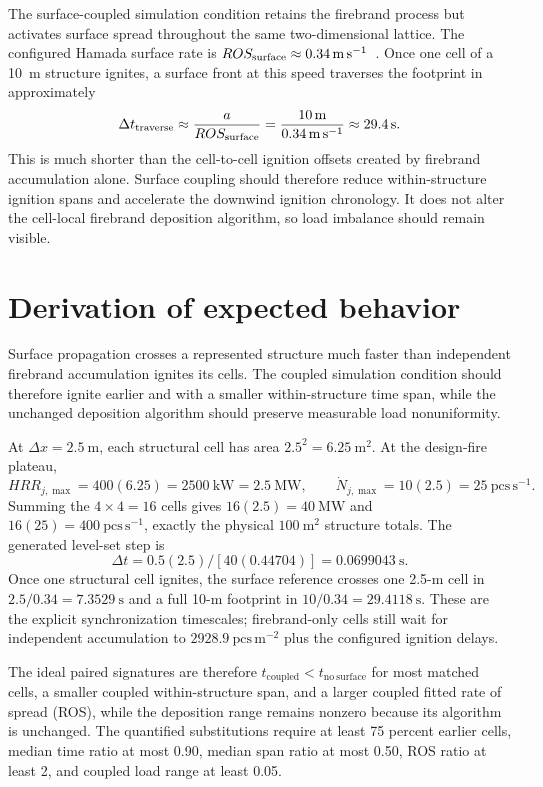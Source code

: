 The surface-coupled simulation condition retains the firebrand process but activates surface
spread throughout the same two-dimensional lattice. The configured Hamada
surface rate is
\(ROS_{\rm surface}\approx\SI{0.34}{m.s^{-1}}\)~\cite{Qin2025}. Once one cell of a
\SI{10}{m} structure ignites, a surface front at this speed traverses the
footprint in approximately
\[
  \Delta t_{\rm traverse}
  \approx \frac{a}{ROS_{\rm surface}}
  =\frac{\SI{10}{m}}{\SI{0.34}{m.s^{-1}}}
  \approx\SI{29.4}{s}.
\]
This is much shorter than the cell-to-cell ignition offsets created by
firebrand accumulation alone. Surface coupling should therefore reduce
within-structure ignition spans and accelerate the downwind ignition
chronology. It does not alter the cell-local firebrand deposition algorithm,
so load imbalance should remain visible.

\section{Derivation of expected behavior}
Surface propagation crosses a represented structure much faster than independent firebrand accumulation ignites its cells. The coupled simulation condition should therefore ignite earlier and with a smaller within-structure time span, while the unchanged deposition algorithm should preserve measurable load nonuniformity.

At \(\Delta x=2.5~\mathrm{m}\), each structural cell has area
\(2.5^2=6.25~\mathrm{m^2}\).  At the design-fire plateau,
\[
 HRR_{j,\max}=400(6.25)=2500~\mathrm{kW}=2.5~\mathrm{MW},
 \qquad \dot N_{j,\max}=10(2.5)=25~\mathrm{pcs\,s^{-1}}.
\]
Summing the \(4\times4=16\) cells gives
\(16(2.5)=40~\mathrm{MW}\) and
\(16(25)=400~\mathrm{pcs\,s^{-1}}\), exactly the physical
\(100~\mathrm{m^2}\) structure totals.  The generated level-set step is
\[
 \Delta t=0.5(2.5)/[40(0.44704)]=0.0699043~\mathrm{s}.
\]
Once one structural cell ignites, the surface reference crosses one 2.5-m
cell in \(2.5/0.34=7.3529~\mathrm{s}\) and a full 10-m footprint in
\(10/0.34=29.4118~\mathrm{s}\).  These are the explicit synchronization
timescales; firebrand-only cells still wait for independent accumulation to
\(2928.9~\mathrm{pcs\,m^{-2}}\) plus the configured ignition delays.

The ideal paired signatures are therefore
\(t_{\mathrm{coupled}}<t_{\mathrm{no\ surface}}\) for most matched cells,
a smaller coupled within-structure span, and a larger coupled fitted rate of spread (ROS),
while the deposition range remains nonzero because its algorithm is unchanged.
The quantified substitutions require at least 75 percent earlier cells,
median time ratio at most 0.90, median span ratio at most 0.50, ROS ratio at
least 2, and coupled load range at least 0.05.

